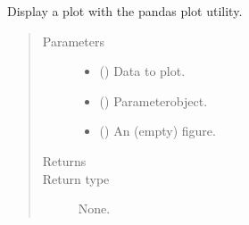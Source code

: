 \documentclass[letterpaper,10pt,english]{sphinxmanual}
\begin{document}
\begin{fulllineitems}
\label{\detokenize{vec_plot:openpivgui.vec_plot.pandas_plot}}
Display a plot with the pandas plot utility.
\begin{quote}\begin{description}
\item[{Parameters}] \leavevmode\begin{itemize}
\item {} 
 () \textendash{} Data to plot.

\item {} 
 () \textendash{} Parameter\sphinxhyphen{}object.

\item {} 
 () \textendash{} An (empty) figure.

\end{itemize}

\item[{Returns}] \leavevmode


\item[{Return type}] \leavevmode
None.

\end{description}\end{quote}

\end{fulllineitems}

\end{document}

